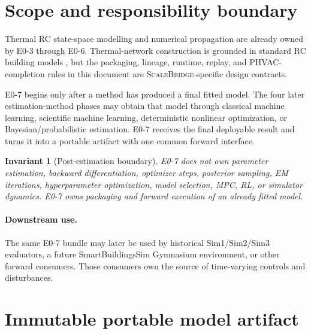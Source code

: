 \documentclass[11pt]{article}
\newcommand{\SB}{\textsc{ScaleBridge}}
\newtheorem{invariant}{Invariant}
\begin{document}
\section{Scope and responsibility boundary}

Thermal RC state-space modelling and numerical propagation are already owned by
E0-3 through E0-6. Thermal-network construction is grounded in standard RC
building models \cite{BacherMadsen2011HeatDynamics,GhiausAhmad2020ThermalCircuits},
but the packaging, lineage, runtime, replay, and PHVAC-completion rules in this
document are \SB{}-specific design contracts.

E0-7 begins only after a method has produced a final fitted model. The four later
estimation-method phases may obtain that model through classical machine
learning, scientific machine learning, deterministic nonlinear optimization, or
Bayesian/probabilistic estimation. E0-7 receives the final deployable result and
turns it into a portable artifact with one common forward interface.

\begin{invariant}[Post-estimation boundary]
E0-7 does not own parameter estimation, backward differentiation, optimizer
steps, posterior sampling, EM iterations, hyperparameter optimization, model
selection, MPC, RL, or simulator dynamics. E0-7 owns packaging and forward
execution of an already fitted model.
\end{invariant}

\paragraph{Downstream use.}
The same E0-7 bundle may later be used by historical Sim1/Sim2/Sim3 evaluators,
a future SmartBuildingsSim Gymnasium environment, or other forward consumers.
Those consumers own the source of time-varying controls and disturbances.

\section{Immutable portable model artifact}
\end{document}
